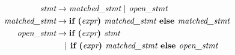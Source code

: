 
\begin{align}
\textit{stmt} &\rightarrow \textit{matched\_stmt} \text{ | } \textit{open\_stmt} \nonumber \\
\textit{matched\_stmt} &\rightarrow \textbf{if } \textbf{(}\textit{expr}\textbf{) } \textit{matched\_stmt} \textbf{ else } \textit{matched\_stmt} \nonumber \\
\textit{open\_stmt} &\rightarrow \textbf{if } \textbf{(}\textit{expr}\textbf{) } \textit{stmt} \nonumber \\
&\phantom{\rightarrow}| \hspace{0.15cm} \textbf{if } \textbf{(}\textit{expr}\textbf{) } \textit{matched\_stmt} \textbf{ else } \textit{open\_stmt} \nonumber
\end{align}
